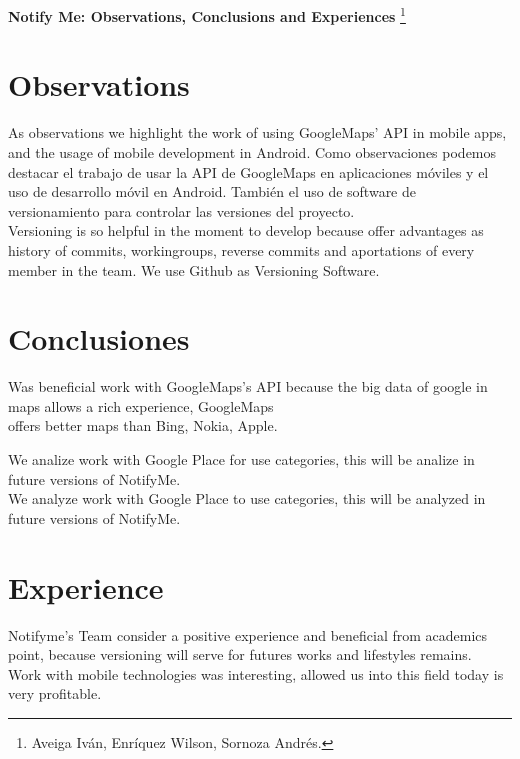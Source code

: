 \textbf{Notify Me: Observations, Conclusions and Experiences} \footnote{Aveiga Iván, Enríquez Wilson, Sornoza Andrés.}
\section{Observations}

As observations we highlight the work of using GoogleMaps' API in mobile apps, and the usage of mobile development in  Android. 
Como observaciones podemos destacar el trabajo de usar la API de GoogleMaps en aplicaciones móviles y el uso de desarrollo móvil en Android. También el uso de software de versionamiento para controlar las versiones del proyecto. \\

Versioning is so helpful in the moment to develop because offer advantages as history of commits, workingroups, reverse commits and aportations of every member in the team. We use Github as Versioning Software.

\section{Conclusiones}
Was beneficial work with GoogleMaps's API because the big data of google in maps allows a rich experience, GoogleMaps \\ offers better maps than Bing, Nokia, Apple.

We analize work with Google Place for use categories, this will be analize in future versions of NotifyMe. \\

We analyze work with Google Place to use categories, this will be analyzed in future versions of NotifyMe.
\section{Experience}

Notifyme's Team consider a positive experience and beneficial from academics point, because versioning will serve for futures works and lifestyles remains.\\

Work with mobile technologies was interesting, allowed us into this field today is very profitable.